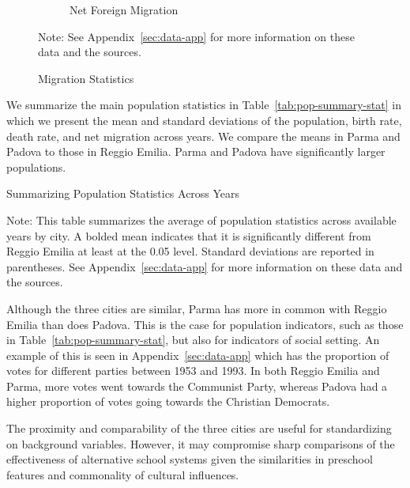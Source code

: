 \begin{figure}[H]
\begin{center}
\begin{subfigure}[ht]{0.48\textwidth}
        \caption{Net Foreign Migration}
        \end{subfigure}
      \caption{Migration Statistics}  \label{fig:emigr-immigr}
      \end{center}
         \raggedright  Note: See Appendix~\ref{sec:data-app} for more information on these data and the sources.
    \end{figure}

We summarize the main population statistics in Table~\ref{tab:pop-summary-stat} in which we present the mean and standard deviations of the population, birth rate, death rate, and net migration across years. We compare the means in Parma and Padova to those in Reggio Emilia. Parma and Padova have significantly larger populations.

    \begin{table}[H]
    \centering
    \caption{Summarizing Population Statistics Across Years} \label{tab:pop-summary-stat}
    \begin{threeparttable}
	
	
\begin{tablenotes}
\item \footnotesize Note: This table summarizes the average of population statistics across available years by city. A bolded mean indicates that it is significantly different from Reggio Emilia at least at the 0.05 level. Standard deviations are reported in parentheses. See Appendix~\ref{sec:data-app} for more information on these data and the sources.
\end{tablenotes}
\end{threeparttable}
\end{table}

Although the three cities are similar, Parma has more in common with Reggio Emilia than does Padova. This is the case for population indicators, such as those in Table~\ref{tab:pop-summary-stat}, but also for indicators of social setting. An example of this is seen in Appendix~\ref{sec:data-app} which has the proportion of votes for different parties between 1953 and 1993. In both Reggio Emilia and Parma, more votes went towards the Communist Party, whereas Padova had a higher proportion of votes going towards the Christian Democrats.

The proximity and comparability of the three cities are useful for standardizing on background variables. However, it may compromise sharp comparisons of the effectiveness of alternative school systems given the similarities in preschool features and commonality of cultural influences.
	

